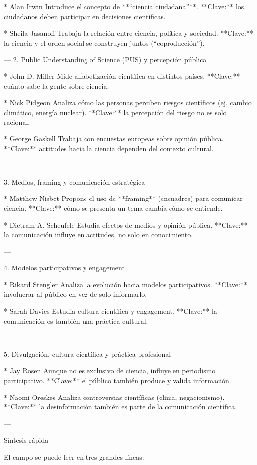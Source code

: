 \documentclass[11pt,                                                            
 superscriptaddress,twoside,
 amsmath,amssymb,
 aps, physrev
]{revtex4-2}
\begin{document}
* Alan Irwin
Introduce el concepto de **“ciencia ciudadana”**.
**Clave:** los ciudadanos deben participar en decisiones científicas.

* Sheila Jasanoff
Trabaja la relación entre ciencia, política y sociedad.
**Clave:** la ciencia y el orden social se construyen juntos (“coproducción”).

---
2. Public Understanding of Science (PUS) y percepción pública

* John D. Miller
Mide alfabetización científica en distintos países.
**Clave:** cuánto sabe la gente sobre ciencia.

* Nick Pidgeon
Analiza cómo las personas perciben riesgos científicos (ej. cambio climático, energía nuclear).
**Clave:** la percepción del riesgo no es solo racional.

* George Gaskell
Trabaja con encuestas europeas sobre opinión pública.
**Clave:** actitudes hacia la ciencia dependen del contexto cultural.

---

3. Medios, framing y comunicación estratégica

* Matthew Nisbet
Propone el uso de **framing** (encuadres) para comunicar ciencia.
**Clave:** cómo se presenta un tema cambia cómo se entiende.

* Dietram A. Scheufele
Estudia efectos de medios y opinión pública.
**Clave:** la comunicación influye en actitudes, no solo en conocimiento.

---

4. Modelos participativos y engagement

* Rikard Stengler
Analiza la evolución hacia modelos participativos.
**Clave:** involucrar al público en vez de solo informarlo.

* Sarah Davies
Estudia cultura científica y engagement.
**Clave:** la comunicación es también una práctica cultural.

---

5. Divulgación, cultura científica y práctica profesional

* Jay Rosen
Aunque no es exclusivo de ciencia, influye en periodismo participativo.
**Clave:** el público también produce y valida información.

* Naomi Oreskes
Analiza controversias científicas (clima, negacionismo).
**Clave:** la desinformación también es parte de la comunicación científica.

---

Síntesis rápida

El campo se puede leer en tres grandes líneas:
\end{document}
